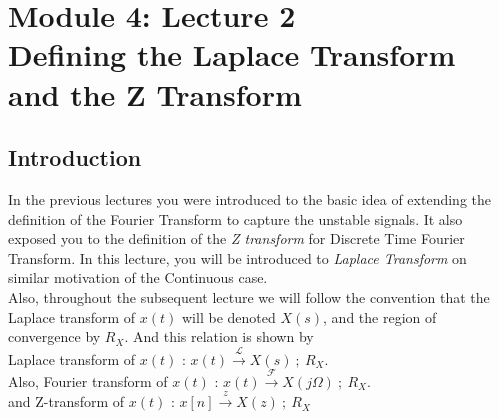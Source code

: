 \section{Module 4: Lecture 2\\Defining the Laplace Transform and the Z Transform}


\subsection{Introduction}
In the previous lectures you were introduced to the basic idea of extending the definition of the Fourier Transform to capture the unstable signals. It also exposed you to the definition of the \textit{Z transform} for Discrete Time Fourier Transform. In this lecture, you will be introduced to \textit{Laplace Transform} on similar motivation of the Continuous case.\\
Also, throughout the subsequent lecture we will follow the convention that the Laplace transform of $x(t)$ will be denoted $X(s)$, and the region of convergence by $R_X$. And this relation is shown by \\
Laplace transform of $x(t)$ : 
$x(t) \xrightarrow{\ \mathcal{L}\ } X(s)\ ;\ R_X $. \\
Also, Fourier transform of $x(t)$ : 
$x(t) \xrightarrow{\ \mathcal{F}\ } X(j\Omega)\ ;\ R_X $. \\ 
and Z-transform of $x(t)$ :
$x[n] \xrightarrow{\ z\ } X(z)\ ;\ R_X$

